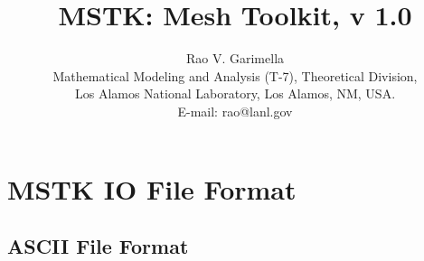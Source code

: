 \documentclass[12pt]{article}
\begin{document}
\title{MSTK: Mesh Toolkit, v 1.0} 


\author{Rao V. Garimella \\
  Mathematical Modeling and Analysis (T-7), Theoretical Division, \\
  Los Alamos National Laboratory, Los Alamos, NM, USA. \\ E-mail:
  rao@lanl.gov}

\maketitle

\thispagestyle{empty}

\newpage

\section{MSTK IO File Format}

\subsection{ASCII File Format}
\end{document}
